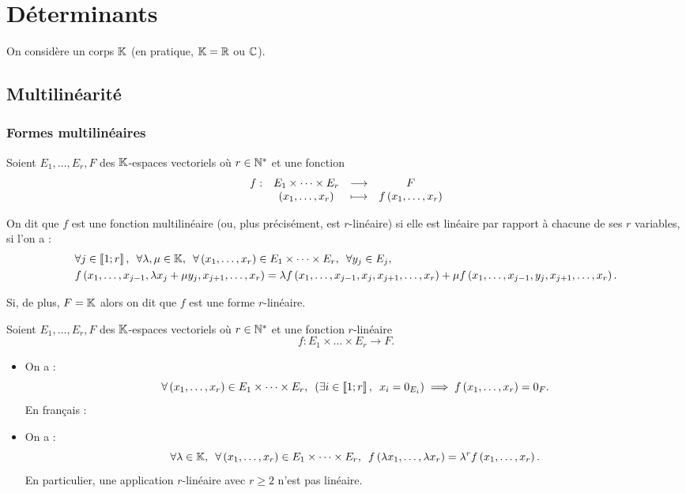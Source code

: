 \chapter{Déterminants}

\minitoc

On considère un corps \(\mathbb{K}\) (en pratique, \(\mathbb{K}=\mathbb{R}\) ou \(\mathbb{C}\)).

\section{Multilinéarité}

\subsection{Formes multilinéaires}

\begin{defi}
Soient \(E_1,\dots,E_r,F\) des \(\mathbb{K}\)-espaces vectoriels où \(r\in\mathbb{N}^*\) et une fonction \[\begin{array}[t]{cccc}f : & E_1\times\dots\times E_r & \longrightarrow & F \\ & \left(x_1,\dots,x_r\right) & \longmapsto & f\left(x_1,\dots,x_r\right)\end{array}\]

On dit que \(f\) est une fonction multilinéaire (ou, plus précisément, est \(r\)-linéaire) si elle est linéaire par rapport à chacune de ses \(r\) variables, \cad si l'on a : \[\begin{aligned}
&\quantifs{\forall j\in\interventierii{1}{r};\forall\lambda,\mu\in\K;\forall\paren{x_1,\dots,x_r}\in E_1\times\dots\times E_r;\forall y_j\in E_j} \\
&f\paren{x_1,\dots,x_{j-1},\lambda x_j+\mu y_j,x_{j+1},\dots,x_r}=\lambda f\paren{x_1,\dots,x_{j-1},x_j,x_{j+1},\dots,x_r}+\mu f\paren{x_1,\dots,x_{j-1},y_j,x_{j+1},\dots,x_r}.
\end{aligned}\]

Si, de plus, \(F=\mathbb{K}\) alors on dit que \(f\) est une forme \(r\)-linéaire.
\end{defi}

\begin{rem}
Soient \(E_1,\dots,E_r,F\) des \(\mathbb{K}\)-espaces vectoriels où \(r\in\mathbb{N}^*\) et une fonction \(r\)-linéaire \[f:E_1\times\dots\times E_r\to F.\]

\begin{itemize}
    \item On a : \[\quantifs{\forall\paren{x_1,\dots,x_r}\in E_1\times\dots\times E_r}\paren{\quantifs{\exists i\in\interventierii{1}{r}}x_i=0_{E_i}}\imp f\paren{x_1,\dots,x_r}=0_F.\] En français :  \\
    \item On a : \[\quantifs{\forall\lambda\in\K;\forall\paren{x_1,\dots,x_r}\in E_1\times\dots\times E_r}f\paren{\lambda x_1,\dots,\lambda x_r}=\lambda^rf\paren{x_1,\dots,x_r}.\] En particulier, une application \(r\)-linéaire avec \(r\geq2\) n'est pas linéaire.
\end{itemize}
\end{rem}

